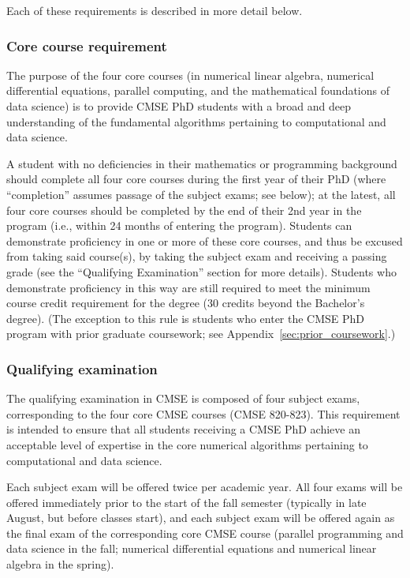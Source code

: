 Each of these requirements is described in more detail below.

\vspace{3mm}
\subsubsection{Core course requirement}
\label{sec:core_courses}

The purpose of the four core courses (in numerical linear algebra,
numerical differential equations, parallel computing, and the
mathematical foundations of data science) is to provide CMSE PhD
students with a broad and deep understanding of the fundamental
algorithms pertaining to computational and data science.

A student with no deficiencies in their mathematics or programming
background should complete all four core courses during the first year
of their PhD (where ``completion'' assumes passage of the subject exams;
see below); at the latest, all four core courses should be completed
by the end of their 2nd year in the program (i.e., within 24 months of
entering the program).  Students can demonstrate proficiency in
one or more of these core courses, and thus be excused from taking
said course(s), by taking the subject exam and receiving a passing
grade (see the ``Qualifying Examination'' section for more details).
Students who demonstrate proficiency in this way are still required to
meet the minimum course credit requirement for the degree (30 credits
beyond the Bachelor's degree).  (The exception to this rule is
students who enter the CMSE PhD program with prior graduate
coursework; see Appendix~\ref{sec:prior_coursework}.)

\vspace{3mm}
\subsubsection{Qualifying examination}
\label{sec:qual_exam}

The qualifying examination in CMSE is composed of four subject exams,
corresponding to the four core CMSE courses (CMSE 820-823). This
requirement is intended to ensure that all students receiving a CMSE
PhD achieve an acceptable level of expertise in the core numerical
algorithms pertaining to computational and data science.  

Each subject exam will be offered twice per academic year.  All four
exams will be offered immediately prior to the start of the fall
semester (typically in late August, but before classes start), 
and each subject exam will be offered again as the final
exam of the corresponding core CMSE course (parallel programming and
data science in the fall; numerical differential equations
and numerical linear algebra in the spring).

